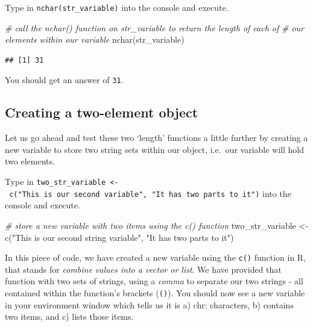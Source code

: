 \documentclass[
]{book}
\newenvironment{Shaded}{\begin{snugshade}}{\end{snugshade}}
\newcommand{\CommentTok}[1]{\textcolor[rgb]{0.56,0.35,0.01}{\textit{#1}}}
\newcommand{\FunctionTok}[1]{\textcolor[rgb]{0.00,0.00,0.00}{#1}}
\newcommand{\NormalTok}[1]{#1}
\newcommand{\OtherTok}[1]{\textcolor[rgb]{0.56,0.35,0.01}{#1}}
\newcommand{\StringTok}[1]{\textcolor[rgb]{0.31,0.60,0.02}{#1}}
\begin{document}
Type in \texttt{nchar(str\_variable)} into the console and execute.

\begin{Shaded}
\begin{Highlighting}[]
\CommentTok{\# call the nchar() function on str\_variable to return the length of each of}
\CommentTok{\# our elements within our variable}
\FunctionTok{nchar}\NormalTok{(str\_variable)}
\end{Highlighting}
\end{Shaded}

\begin{verbatim}
## [1] 31
\end{verbatim}

You should get an answer of \texttt{31}.

\hypertarget{creating-a-two-element-object}{%
\subsection{Creating a two-element object}\label{creating-a-two-element-object}}

Let us go ahead and test these two `length' functions a little further by creating a new variable to store two string sets within our object, i.e.~our variable will hold two elements.

Type in \texttt{two\_str\_variable\ \textless{}-\ c("This\ is\ our\ second\ variable",\ "It\ has\ two\ parts\ to\ it")} into the console and execute.

\begin{Shaded}
\begin{Highlighting}[]
\CommentTok{\# store a new variable with two items using the c() function}
\NormalTok{two\_str\_variable }\OtherTok{\textless{}{-}} \FunctionTok{c}\NormalTok{(}\StringTok{"This is our second string variable"}\NormalTok{, }\StringTok{"It has two parts to it"}\NormalTok{)}
\end{Highlighting}
\end{Shaded}

In this piece of code, we have created a new variable using the \texttt{c()} function in R, that stands for \emph{combine values into a vector or list}. We have provided that function with two sets of strings, using a \emph{comma} to separate our two strings - all contained within the function's brackets (\texttt{()}). You should now see a new variable in your environment window which tells us it is a) chr: characters, b) contains two items, and c) lists those items.
\end{document}
